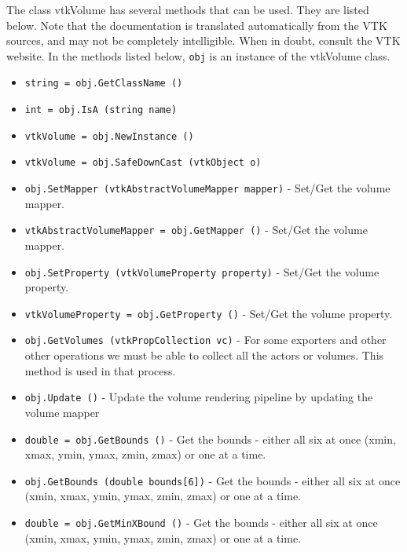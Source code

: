 The class vtkVolume has several methods that can be used.
  They are listed below.
Note that the documentation is translated automatically from the VTK sources,
and may not be completely intelligible.  When in doubt, consult the VTK website.
In the methods listed below, \verb|obj| is an instance of the vtkVolume class.
\begin{itemize}
\item  \verb|string = obj.GetClassName ()|

\item  \verb|int = obj.IsA (string name)|

\item  \verb|vtkVolume = obj.NewInstance ()|

\item  \verb|vtkVolume = obj.SafeDownCast (vtkObject o)|

\item  \verb|obj.SetMapper (vtkAbstractVolumeMapper mapper)| -  Set/Get the volume mapper.

\item  \verb|vtkAbstractVolumeMapper = obj.GetMapper ()| -  Set/Get the volume mapper.

\item  \verb|obj.SetProperty (vtkVolumeProperty property)| -  Set/Get the volume property.

\item  \verb|vtkVolumeProperty = obj.GetProperty ()| -  Set/Get the volume property.

\item  \verb|obj.GetVolumes (vtkPropCollection vc)| -  For some exporters and other other operations we must be
 able to collect all the actors or volumes. This method
 is used in that process.

\item  \verb|obj.Update ()| -  Update the volume rendering pipeline by updating the volume mapper

\item  \verb|double = obj.GetBounds ()| -  Get the bounds - either all six at once 
 (xmin, xmax, ymin, ymax, zmin, zmax) or one at a time.

\item  \verb|obj.GetBounds (double bounds[6])| -  Get the bounds - either all six at once 
 (xmin, xmax, ymin, ymax, zmin, zmax) or one at a time.

\item  \verb|double = obj.GetMinXBound ()| -  Get the bounds - either all six at once 
 (xmin, xmax, ymin, ymax, zmin, zmax) or one at a time.


\end{itemize}
